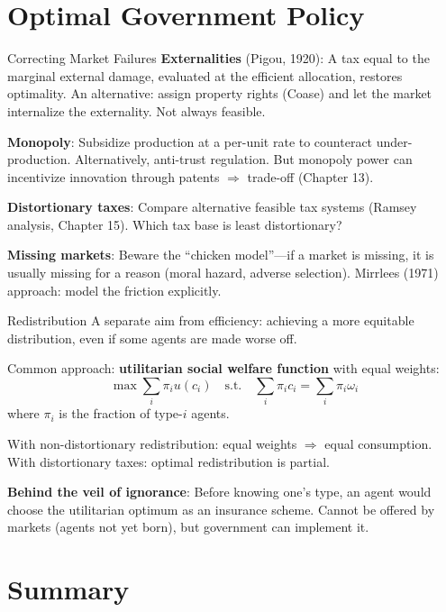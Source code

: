 \documentclass[blue]{beamer}
\begin{document}
\section{Optimal Government Policy}

\begin{frame}{Correcting Market Failures}
	\textbf{Externalities} (Pigou, 1920): A tax equal to the marginal external damage, evaluated at the efficient allocation, restores optimality. An alternative: assign property rights (Coase) and let the market internalize the externality. Not always feasible.
	
	\textbf{Monopoly}: Subsidize production at a per-unit rate to counteract under-production. Alternatively, anti-trust regulation. But monopoly power can incentivize innovation through patents $\Rightarrow$ trade-off (Chapter 13).
	
	\textbf{Distortionary taxes}: Compare alternative feasible tax systems (Ramsey analysis, Chapter 15). Which tax base is least distortionary?
	
	\textbf{Missing markets}: Beware the ``chicken model''---if a market is missing, it is usually missing for a reason (moral hazard, adverse selection). Mirrlees (1971) approach: model the friction explicitly.
\end{frame}

\begin{frame}{Redistribution}
	A separate aim from efficiency: achieving a more equitable distribution, even if some agents are made worse off.
	
	Common approach: \textbf{utilitarian social welfare function} with equal weights:
	\[
	\max \sum_{i} \pi_i u(c_i) \quad \text{s.t.} \quad \sum_{i} \pi_i c_i = \sum_{i} \pi_i \omega_i
	\]
	where $\pi_i$ is the fraction of type-$i$ agents.

	With non-distortionary redistribution: equal weights $\Rightarrow$ equal consumption. With distortionary taxes: optimal redistribution is partial.
	

	\textbf{Behind the veil of ignorance}: Before knowing one's type, an agent would choose the utilitarian optimum as an insurance scheme. Cannot be offered by markets (agents not yet born), but government can implement it.
\end{frame}

\section{Summary}
\end{document}

